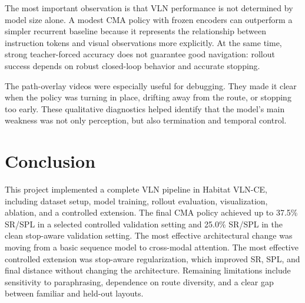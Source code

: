 The most important observation is that VLN performance is not determined by model size alone. A modest CMA policy with frozen encoders can outperform a simpler recurrent baseline because it represents the relationship between instruction tokens and visual observations more explicitly. At the same time, strong teacher-forced accuracy does not guarantee good navigation: rollout success depends on robust closed-loop behavior and accurate stopping.

The path-overlay videos were especially useful for debugging. They made it clear when the policy was turning in place, drifting away from the route, or stopping too early. These qualitative diagnostics helped identify that the model's main weakness was not only perception, but also termination and temporal control.

\section{Conclusion}

This project implemented a complete VLN pipeline in Habitat VLN-CE, including dataset setup, model training, rollout evaluation, visualization, ablation, and a controlled extension. The final CMA policy achieved up to 37.5\% SR/SPL in a selected controlled validation setting and 25.0\% SR/SPL in the clean stop-aware validation setting. The most effective architectural change was moving from a basic sequence model to cross-modal attention. The most effective controlled extension was stop-aware regularization, which improved SR, SPL, and final distance without changing the architecture. Remaining limitations include sensitivity to paraphrasing, dependence on route diversity, and a clear gap between familiar and held-out layouts.





